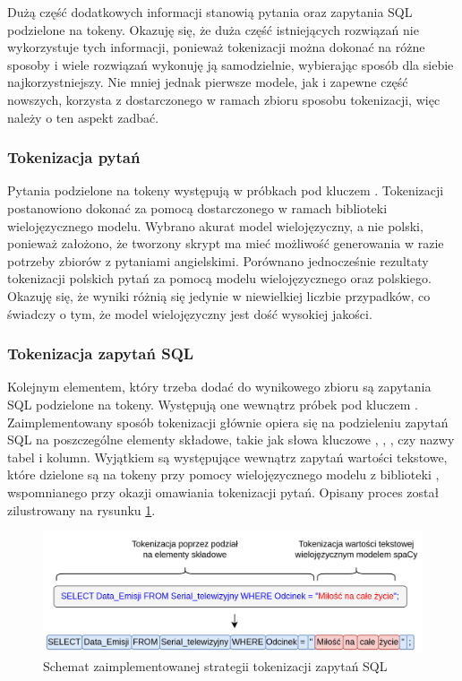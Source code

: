 Dużą część dodatkowych informacji stanowią pytania oraz zapytania SQL podzielone na tokeny. Okazuję się, że duża część istniejących rozwiązań nie wykorzystuje tych informacji, ponieważ tokenizacji można dokonać na różne sposoby i wiele rozwiązań wykonuję ją samodzielnie, wybierając sposób dla siebie najkorzystniejszy. Nie mniej jednak pierwsze modele, jak i zapewne część nowszych, korzysta z dostarczonego w ramach zbioru sposobu tokenizacji, więc należy o ten aspekt zadbać.

\subsubsection{Tokenizacja pytań}
Pytania podzielone na tokeny występują w próbkach pod kluczem . Tokenizacji postanowiono dokonać za pomocą dostarczonego w ramach biblioteki  wielojęzycznego modelu. Wybrano akurat model wielojęzyczny, a nie polski, ponieważ założono, że tworzony skrypt ma mieć możliwość generowania w razie potrzeby zbiorów z pytaniami angielskimi. Porównano jednocześnie rezultaty tokenizacji polskich pytań za pomocą modelu wielojęzycznego oraz polskiego. Okazuję się, że wyniki różnią się jedynie w niewielkiej liczbie przypadków, co świadczy o tym, że model wielojęzyczny jest dość wysokiej jakości.

\subsubsection{Tokenizacja zapytań SQL}
Kolejnym elementem, który trzeba dodać do wynikowego zbioru są zapytania SQL podzielone na tokeny. Występują one wewnątrz próbek pod kluczem . Zaimplementowany sposób tokenizacji głównie opiera się na podzieleniu zapytań SQL na poszczególne elementy składowe, takie jak słowa kluczowe , , , czy nazwy tabel i kolumn. Wyjątkiem są występujące wewnątrz zapytań wartości tekstowe, które dzielone są na tokeny przy pomocy wielojęzycznego modelu z biblioteki , wspomnianego przy okazji omawiania tokenizacji pytań. Opisany proces został zilustrowany na rysunku \ref{fig:query-tokenization}.

\begin{figure}[ht!]
  \centering
  \includegraphics[width=1.0\linewidth]{images/query_tokenization.png}
  \caption{Schemat zaimplementowanej strategii tokenizacji zapytań SQL}
  \label{fig:query-tokenization}
\end{figure}

